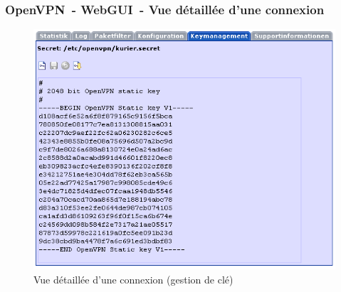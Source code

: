 \subsubsection{OpenVPN~- WebGUI~- Vue détaillée d'une connexion}
  \begin{figure}[!h]
    \centering
    \includegraphics[width=400pt]{detail}
    \caption{Vue détaillée d'une connexion (gestion de clé)}
    \label{fig:guidetail}
  \end{figure}

